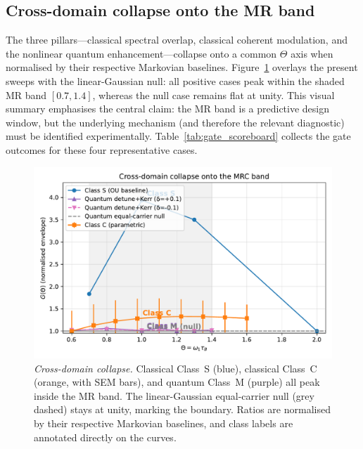 \documentclass[11pt,letterpaper]{article}
\begin{document}
\subsection{Cross-domain collapse onto the MR band}
The three pillars---classical spectral overlap, classical coherent modulation, and the nonlinear quantum enhancement---collapse onto a common $\Theta$ axis when normalised by their respective Markovian baselines. Figure~\ref{fig:collapse} overlays the present sweeps with the linear-Gaussian null: all positive cases peak within the shaded MR band $[0.7,1.4]$, whereas the null case remains flat at unity. This visual summary emphasises the central claim: the MR band is a predictive design window, but the underlying mechanism (and therefore the relevant diagnostic) must be identified experimentally. Table~\ref{tab:gate_scoreboard} collects the gate outcomes for these four representative cases.

\begin{figure}[t]
\centering
\includegraphics[width=0.8\linewidth]{figE_collapse.pdf}
\caption{\label{fig:collapse}\emph{Cross-domain collapse.} Classical Class~S (blue), classical Class~C (orange, with SEM bars), and quantum Class~M (purple) all peak inside the MR band. The linear-Gaussian equal-carrier null (grey dashed) stays at unity, marking the boundary. Ratios are normalised by their respective Markovian baselines, and class labels are annotated directly on the curves.}
\end{figure}
\end{document}
